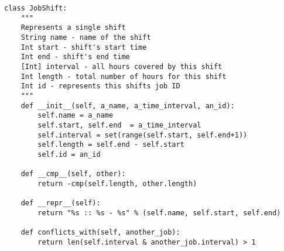 \documentclass[12pt]{article}
\theoremstyle{definition}
\begin{document}
\begin{lstlisting}
class JobShift:
    """
    Represents a single shift
    String name - name of the shift
    Int start - shift's start time
    Int end - shift's end time
    [Int] interval - all hours covered by this shift
    Int length - total number of hours for this shift
    Int id - represents this shifts job ID
    """
    def __init__(self, a_name, a_time_interval, an_id):
        self.name = a_name
        self.start, self.end  = a_time_interval
        self.interval = set(range(self.start, self.end+1))
        self.length = self.end - self.start
        self.id = an_id

    def __cmp__(self, other):
        return -cmp(self.length, other.length)

    def __repr__(self):
        return "%s :: %s - %s" % (self.name, self.start, self.end)

    def conflicts_with(self, another_job):
        return len(self.interval & another_job.interval) > 1

\end{lstlisting}
\end{document}
